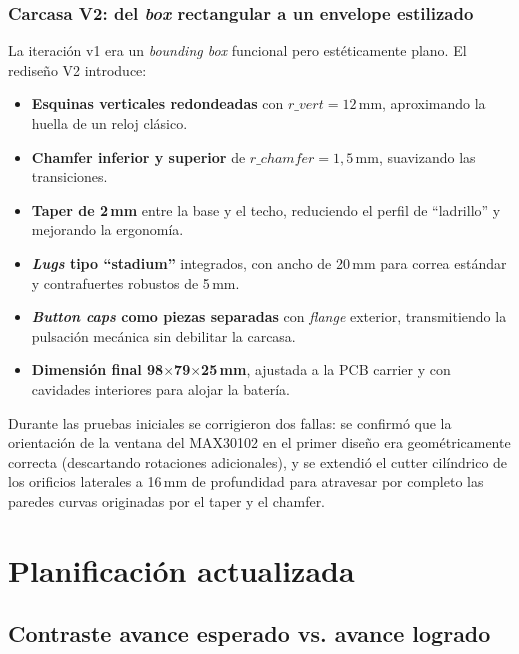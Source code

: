 \documentclass[letterpaper,11pt]{article}
\begin{document}
\subsubsection{Carcasa V2: del \textit{box} rectangular a un envelope estilizado}

La iteración v1 era un \textit{bounding box} funcional pero estéticamente plano. El rediseño V2 introduce:
\begin{itemize}
    \item \textbf{Esquinas verticales redondeadas} con $r\_vert = 12$\,mm, aproximando la huella de un reloj clásico.
    \item \textbf{Chamfer inferior y superior} de $r\_chamfer = 1,5$\,mm, suavizando las transiciones.
    \item \textbf{Taper de 2\,mm} entre la base y el techo, reduciendo el perfil de ``ladrillo'' y mejorando la ergonomía.
    \item \textbf{\textit{Lugs} tipo ``stadium''} integrados, con ancho de 20\,mm para correa estándar y contrafuertes robustos de 5\,mm.
    \item \textbf{\textit{Button caps} como piezas separadas} con \textit{flange} exterior, transmitiendo la pulsación mecánica sin debilitar la carcasa.
    \item \textbf{Dimensión final 98$\times$79$\times$25\,mm}, ajustada a la PCB carrier y con cavidades interiores para alojar la batería.
\end{itemize}

Durante las pruebas iniciales se corrigieron dos fallas: se confirmó que la orientación de la ventana del MAX30102 en el primer diseño era geométricamente correcta (descartando rotaciones adicionales), y se extendió el cutter cilíndrico de los orificios laterales a 16\,mm de profundidad para atravesar por completo las paredes curvas originadas por el taper y el chamfer.

\newpage

\section{Planificación actualizada}

\subsection{Contraste avance esperado vs. avance logrado}
\end{document}
